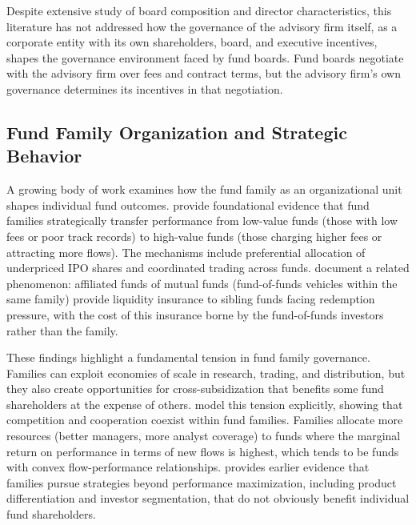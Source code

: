 \documentclass[hidelinks,12pt]{article}
\begin{document}
Despite extensive study of board composition and director characteristics, this literature has not addressed how the governance of the advisory firm itself, as a corporate entity with its own shareholders, board, and executive incentives, shapes the governance environment faced by fund boards. Fund boards negotiate with the advisory firm over fees and contract terms, but the advisory firm's own governance determines its incentives in that negotiation.

\subsection{Fund Family Organization and Strategic Behavior}

A growing body of work examines how the fund family as an organizational unit shapes individual fund outcomes. \citet{gaspar2006favoritism} provide foundational evidence that fund families strategically transfer performance from low-value funds (those with low fees or poor track records) to high-value funds (those charging higher fees or attracting more flows). The mechanisms include preferential allocation of underpriced IPO shares and coordinated trading across funds. \citet{bhattacharya2013conflicting} document a related phenomenon: affiliated funds of mutual funds (fund-of-funds vehicles within the same family) provide liquidity insurance to sibling funds facing redemption pressure, with the cost of this insurance borne by the fund-of-funds investors rather than the family.

These findings highlight a fundamental tension in fund family governance. Families can exploit economies of scale in research, trading, and distribution, but they also create opportunities for cross-subsidization that benefits some fund shareholders at the expense of others. \citet{evans2019competition} model this tension explicitly, showing that competition and cooperation coexist within fund families. Families allocate more resources (better managers, more analyst coverage) to funds where the marginal return on performance in terms of new flows is highest, which tends to be funds with convex flow-performance relationships. \citet{massa2003family} provides earlier evidence that families pursue strategies beyond performance maximization, including product differentiation and investor segmentation, that do not obviously benefit individual fund shareholders.
\end{document}
